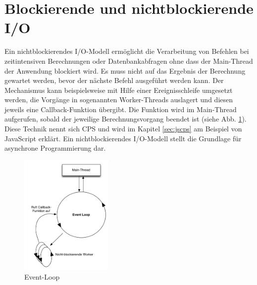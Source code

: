 \section{Blockierende und nichtblockierende \acs{I/O}}
\label{sec:nonblocking}Ein nichtblockierendes I/O-Modell ermöglicht die Verarbeitung von Befehlen bei zeitintensiven Berechnungen oder Datenbankabfragen ohne dass der Main-Thread der Anwendung blockiert wird. Es muss nicht auf das Ergebnis der Berechnung gewartet werden, bevor der nächste Befehl ausgeführt werden kann. Der Mechanismus kann beispielsweise mit Hilfe einer Ereignisschleife umgesetzt werden, die Vorgänge in sogenannten Worker-Threads auslagert und diesen jeweils eine Callback-Funktion übergibt. Die Funktion wird im Main-Thread aufgerufen, sobald der jeweilige Berechnungsvorgang beendet ist (siehe Abb. \ref{fig:nonblocking}). Diese Technik nennt sich \acf{CPS} und wird im Kapitel \ref{sec:jscps} am Beispiel von JavaScript erklärt. Ein nichtblockierendes I/O-Modell stellt die Grundlage für asynchrone Programmierung dar.
\begin{figure}[H]
\centering
\includegraphics[width=0.4\textwidth]{images/nonblocking.png}
\caption[Event-Loop]{Event-Loop}
\label{fig:nonblocking}
\end{figure}
\acresetall
